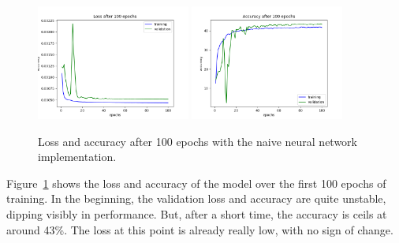 \begin{figure}
	\centering
	\includegraphics[width=0.45\textwidth]{images/entropyloss.png}
	\centering
	\quad\includegraphics[width=0.45\textwidth]{images/entropyacc.png}
	\caption{Loss and accuracy after 100 epochs with the naive neural
	network implementation.}
	\label{naiveloss}
\end{figure}

Figure~\ref{naiveloss} shows the loss and accuracy of the model over the
first 100 epochs of training. In the beginning, the validation loss and
accuracy are quite unstable, dipping visibly in performance. But, after
a short time, the accuracy is ceils at around 43\%. The loss at this
point is already really low, with no sign of change.


